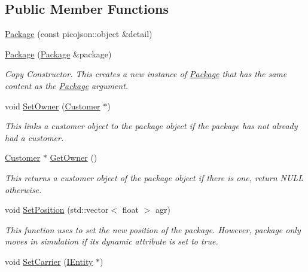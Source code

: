 \subsection*{Public Member Functions}
\begin{DoxyCompactItemize}
\item 
\hyperlink{classcsci3081_1_1Package_abf7f7782bd24ceeae85f4ec6e16a8021}{Package} (const picojson\+::object \&detail)
\item 
\hyperlink{classcsci3081_1_1Package_a9a5517a9f494de1dda493c0613918e00}{Package} (\hyperlink{classcsci3081_1_1Package}{Package} \&package)
\begin{DoxyCompactList}\small\item\em Copy Constructor. This creates a new instance of \hyperlink{classcsci3081_1_1Package}{Package} that has the same content as the \hyperlink{classcsci3081_1_1Package}{Package} argument. \end{DoxyCompactList}\item 
void \hyperlink{classcsci3081_1_1Package_afc93b118e87b8dc43388a0e8f485f830}{Set\+Owner} (\hyperlink{classcsci3081_1_1Customer}{Customer} $\ast$)
\begin{DoxyCompactList}\small\item\em This links a customer object to the package object if the package has not already had a customer. \end{DoxyCompactList}\item 
\mbox{\label{classcsci3081_1_1Package_a0d58f83494c174f43a0b94dfbaaebfc7}} 
\hyperlink{classcsci3081_1_1Customer}{Customer} $\ast$ \hyperlink{classcsci3081_1_1Package_a0d58f83494c174f43a0b94dfbaaebfc7}{Get\+Owner} ()
\begin{DoxyCompactList}\small\item\em This returns a customer object of the package object if there is one, return N\+U\+LL otherwise. \end{DoxyCompactList}\item 
void \hyperlink{classcsci3081_1_1Package_afc467e1989fa6d08182e22006afcc9cd}{Set\+Position} (std\+::vector$<$ float $>$ agr)
\begin{DoxyCompactList}\small\item\em This function uses to set the new position of the package. However, package only moves in simulation if its dynamic attribute is set to true. \end{DoxyCompactList}\item 
void \hyperlink{classcsci3081_1_1Package_abf6700f1011412936069e7cff9ea86c9}{Set\+Carrier} (\hyperlink{classentity__project_1_1IEntity}{I\+Entity} $\ast$)

\end{DoxyCompactItemize}
